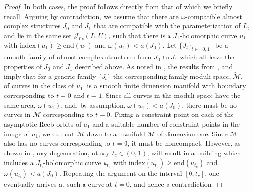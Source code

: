 \documentclass[12pt]{amsart}
\theoremstyle{definition}
\newcommand{\RR}{{\mathbb R}}
\begin{document}
\begin{proof}

In both cases, the proof follows directly from that of  \cite[Lemma 3.7]{ho} which we briefly recall. Arguing by contradiction, we assume that there are $\omega$-compatible almost complex structures $J_0$ and $J_1$ that are compatible with the parameterization of $L$, and lie %
in the same set $\mathcal{J}_{\mathrm{fix}} (L,U)$, such that there is a $J_1$-holomorphic curve $u_1$ with $\mathrm{index}(u_1) \ge \mathrm{end}(u_1)$ and $\omega(u_1) < a(J_0).$  Let $\{J_t\}_{t \in[0,1]}$ be a smooth family of almost complex structures from $J_0$ to $J_1$ which all have the properties of $J_0$ and  $J_1$ described above. As noted in \cite[Lemma 3.7]{ho}, the results from \cite{we}, \cite{ze} and \cite{ohzh} imply that for a generic family $\{J_t\}$  the corresponding family moduli space, $\widetilde{\mathcal{M}}$, of curves in the class of $u_1$, is a smooth finite dimension manifold with boundary corresponding to $t=0$ and $t=1$. Since all curves in the moduli space have the same area, $\omega(u_1)$, and, by assumption, $\omega(u_1)<a(J_0)$, there must be no curves in $\widetilde{\mathcal{M}}$ corresponding to $t=0$. Fixing a constraint point on each of the asymptotic Reeb orbits of $u_1$ and a suitable number of constraint points in the image of $u_1$, we can cut $\widetilde{\mathcal{M}}$ down to a manifold $\mathcal{M}$ of dimension one. Since $\mathcal{M}$ also has no curves corresponding to $t=0$, it must be noncompact. However, as shown in \cite[Lemma 3.7]{ho}, any degeneration, at say $t_c \in (0,1)$, will result in a building which includes a $J_{t_c}$-holomorphic curve $u_{t_c}$ with $\mathrm{index}(u_{t_c}) \ge \mathrm{end}(u_{t_c})$ and $\omega(u_{t_c}) < a(J_0)$. Repeating the argument on the interval $[0,t_c]$, one eventually arrives at such a curve at $t=0$, and hence a contradiction.


\end{proof}
\end{document}
